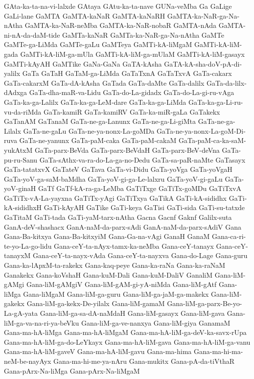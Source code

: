 {GAta-ka-ta-na-vi-lalxde
GAtaya
GAtu-ka-ta-nave
GUNa-veMba
Ga
GaLige
GaLi-lane
GaMTA
GaMTA-kaNaR
GaMTA-kaNaRH
GaMTA-ka-NaR-ga-Na-nAtha
GaMTA-ka-NaR-neMba
GaMTA-ka-NaR-nobaR
GaMTA-nAda
GaMTA-ni-nA-da-daM-tide
GaMTa-kaNaR
GaMTa-ka-NaR-ga-Na-nAtha
GaMTe
GaMTe-ga-LiMda
GaMTe-gaLu
GaMTeya
GaMTi-kA-liMgaM
GaMTi-kA-liM-gada
GaMTi-kA-liM-ga-mUla
GaMTi-kA-liM-ga-mUlaM
GaMTi-kA-liM-gasayx
GaMTi-kAyAH
GaMTike
GaNa-GaNa
GaTA-kAsha
GaTA-kA-sha-doV-pA-di-yalilx
GaTa
GaTaH
GaTaM-ga-LiMda
GaTaTxnA
GaTaTxvA
GaTa-cakarx
GaTa-cakarxM
GaTa-dA-kAsha
GaTada
GaTa-daMte
GaTa-dalilx
GaTa-da-lilx-dAdxga
GaTa-dha-maR-va-Lidu
GaTa-do-La-gidadx
GaTa-do-La-gi-ru-vAga
GaTa-ka-ga-Lalilx
GaTa-ka-ga-LeM-dare
GaTa-ka-ga-LiMda
GaTa-ka-ga-Li-ru-vu-da-riMda
GaTa-kamiR
GaTa-kamiRV
GaTa-ka-miR-gaLa
GaTakekx
GaTanAM
GaTanaM
GaTa-ne-ga-Lanunx
GaTa-ne-ga-Li-giMta
GaTa-ne-ga-Lilalx
GaTa-ne-gaLu
GaTa-ne-ya-nonx-La-goMDa
GaTa-ne-ya-nonx-La-goM-Di-ruva
GaTa-ne-yanunx
GaTa-paM-caka
GaTa-paM-cakaM
GaTa-paM-ca-ka-saM-yukAtxM
GaTa-parx-BeVda
GaTa-parx-BeVdaH
GaTa-parx-BeV-deVna
GaTa-pu-ru-Sanu
GaTa-sAthx-va-ra-do-La-ga-no-Dedu
GaTa-sa-paR-naMte
GaTasayx
GaTa-tatatxvX
GaTateV
GaTava
GaTa-vi-Didu
GaTa-yoVga
GaTa-yoVgaH
GaTa-yoV-ga-saM-baMdha
GaTa-yoV-gi-ga-Le-lalxru
GaTa-yoV-gi-gaLu
GaTa-yoV-ginaH
GaTf
GaTf-kA-ra-ga-LeMba
GaTiTxge
GaTiTx-goMDu
GaTiTxvA
GaTiTx-vA-La-yayxna
GaTiTx-yAgi
GaTiTxya
GaTikA
GaTi-kA-sididhx
GaTi-kA-sididhxH
GaTi-kAyAH
GaTike
GaTi-keya
GaTisi
GaTi-sida
GaTi-su-tatxde
GaTitaM
GaTi-tada
GaTi-yaM-tarx-nAtha
Gacna
Gacnf
Gaknf
Galilx-suta
GanA-deV-shashacx
GanA-naM-da-parx-sAdi
GanA-naM-da-parx-sAdiV
Gana
Gana-Ba-kitxya
Gana-Ba-kitxyiM
Gana-Ga-na-vAgi
GanaH
GanaM
Gana-ca-ri-te-yo-La-go-lidu
Gana-ceY-ta-nAyx-tamx-ka-neMba
Gana-ceY-tanayx
Gana-ceY-tanayxM
Gana-ceY-ta-nayx-vAda
Gana-ceY-ta-nayxva
Gana-do-Lage
Gana-guru
Gana-ka-lApxM-ta-rakekx
Gana-kaq-peye
Gana-ka-raNa
Gana-ka-raNaM
Ganakekx
Gana-koVshaH
Gana-kuM-Dali
Gana-kuM-DaliV
GanaliM
Gana-liM-gAMgi
Gana-liM-gAMgiV
Gana-liM-gAM-gi-yA-niMda
Gana-liM-gAtf
Gana-liMga
Gana-liMgaM
Gana-liM-ga-guru
Gana-liM-ga-jaM-ga-makekx
Gana-liM-gakekx
Gana-liM-ga-kekx-De-yilalx
Gana-liM-gamaM
Gana-liM-ga-parx-Be-yo-La-gA-yata
Gana-liM-ga-sa-dA-naMdaH
Gana-liM-gasayx
Gana-liM-gava
Gana-liM-ga-va-na-ri-ya-beVku
Gana-liM-ga-ve-nanxya
Gana-liM-giya
GanamaM
Gana-ma-hA-liMga
Gana-ma-hA-liMgaM
Gana-ma-hA-liM-ga-deV-ka-savx-rUpa
Gana-ma-hA-liM-ga-do-LeYkayx
Gana-ma-hA-liM-gava
Gana-ma-hA-liM-ga-vanu
Gana-ma-hA-liM-gaveV
Gana-ma-hA-liM-gavu
Gana-ma-hima
Gana-ma-hi-ma-neM-be-nayAyx
Gana-ma-hi-me-ya-nAru
Gana-mukitx
Gana-pA-da-tiVthaR
Gana-pArx-Na-liMga
Gana-pArx-Na-liMgaM
}
